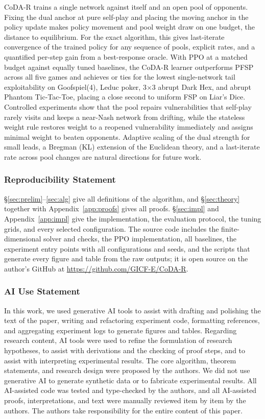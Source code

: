\documentclass{article}
\theoremstyle{plain}
\theoremstyle{remark}
\newcommand{\codar}{CoDA-R}
\begin{document}
\codar{} trains a single network against itself and an open pool of opponents. Fixing the dual anchor at pure self-play and placing the moving anchor in the policy update makes policy movement and pool weight draw on one budget, the distance to equilibrium. For the exact algorithm, this gives last-iterate convergence of the trained policy for any sequence of pools, explicit rates, and a quantified per-step gain from a best-response oracle. With PPO at a matched budget against equally tuned baselines, the \codar{} learner outperforms PFSP across all five games and achieves or ties for the lowest single-network tail exploitability on Goofspiel(4), Leduc poker, 3$\times$3 abrupt Dark Hex, and abrupt Phantom Tic-Tac-Toe, placing a close second to uniform FSP on Liar's Dice. Controlled experiments show that the pool repairs vulnerabilities that self-play rarely visits and keeps a near-Nash network from drifting, while the stateless weight rule restores weight to a reopened vulnerability immediately and assigns minimal weight to beaten opponents. Adaptive scaling of the dual strength for small leads, a Bregman (KL) extension of the Euclidean theory, and a last-iterate rate across pool changes are natural directions for future work.

\subsubsection*{Reproducibility Statement}
\S\ref{sec:prelim}--\ref{sec:alg} give all definitions of the algorithm, and \S\ref{sec:theory} together with Appendix~\ref{app:proofs} gives all proofs. \S\ref{sec:impl} and Appendix~\ref{app:impl} give the implementation, the evaluation protocol, the tuning grids, and every selected configuration. The source code includes the finite-dimensional solver and checks, the PPO implementation, all baselines, the experiment entry points with all configurations and seeds, and the scripts that generate every figure and table from the raw outputs; it is open source on the author's GitHub at \url{https://github.com/GICF-E/CoDA-R}.

\subsubsection*{AI Use Statement}
In this work, we used generative AI tools to assist with drafting and polishing the text of the paper, writing and refactoring experiment code, formatting references, and aggregating experiment logs to generate figures and tables. Regarding research content, AI tools were used to refine the formulation of research hypotheses, to assist with derivations and the checking of proof steps, and to assist with interpreting experimental results. The core algorithm, theorem statements, and research design were proposed by the authors. We did not use generative AI to generate synthetic data or to fabricate experimental results. All AI-assisted code was tested and type-checked by the authors, and all AI-assisted proofs, interpretations, and text were manually reviewed item by item by the authors. The authors take responsibility for the entire content of this paper.
\end{document}

